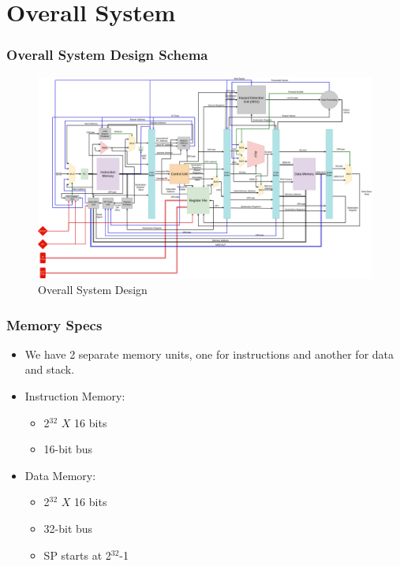 \documentclass[12pt]{report}
\begin{document}
\part{Overall System}

\section{Overall System Design Schema}
\begin{center}
    \begin{figure}[hp]
        \centering
        \includegraphics[width=\textwidth]{overall_system}
        \caption{Overall System Design}
        \label{fig:overall}
    \end{figure}
\end{center}

\section{Memory Specs}
\begin{itemize}
    \item We have 2 separate memory units, one for instructions and another for data and stack.
    \item Instruction Memory:
    \begin{itemize}
        \item 2$^{32}$ $X$ 16 bits
        \item 16-bit bus
    \end{itemize}
    \item Data Memory:
    \begin{itemize}
        \item 2$^{32}$ $X$ 16 bits
        \item 32-bit bus
        \item SP starts at 2$^{32}$-1
    \end{itemize}
\end{itemize}
\end{document}
